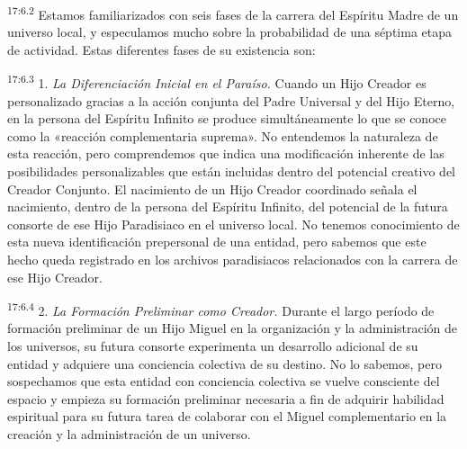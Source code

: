 \par
\textsuperscript{17:6.2} Estamos familiarizados con seis fases de la carrera del Espíritu Madre de un universo local, y especulamos mucho sobre la probabilidad de una séptima etapa de actividad. Estas diferentes fases de su existencia son:

\par
\textsuperscript{17:6.3} 1. \textit{La Diferenciación Inicial en el Paraíso.} Cuando un Hijo Creador es personalizado gracias a la acción conjunta del Padre Universal y del Hijo Eterno, en la persona del Espíritu Infinito se produce simultáneamente lo que se conoce como la «reacción complementaria suprema». No entendemos la naturaleza de esta reacción, pero comprendemos que indica una modificación inherente de las posibilidades personalizables que están incluidas dentro del potencial creativo del Creador Conjunto. El nacimiento de un Hijo Creador coordinado señala el nacimiento, dentro de la persona del Espíritu Infinito, del potencial de la futura consorte de ese Hijo Paradisiaco en el universo local. No tenemos conocimiento de esta nueva identificación prepersonal de una entidad, pero sabemos que este hecho queda registrado en los archivos paradisiacos relacionados con la carrera de ese Hijo Creador.

\par
\textsuperscript{17:6.4} 2. \textit{La Formación Preliminar como Creador.} Durante el largo período de formación preliminar de un Hijo Miguel en la organización y la administración de los universos, su futura consorte experimenta un desarrollo adicional de su entidad y adquiere una conciencia colectiva de su destino. No lo sabemos, pero sospechamos que esta entidad con conciencia colectiva se vuelve consciente del espacio y empieza su formación preliminar necesaria a fin de adquirir habilidad espiritual para su futura tarea de colaborar con el Miguel complementario en la creación y la administración de un universo.


